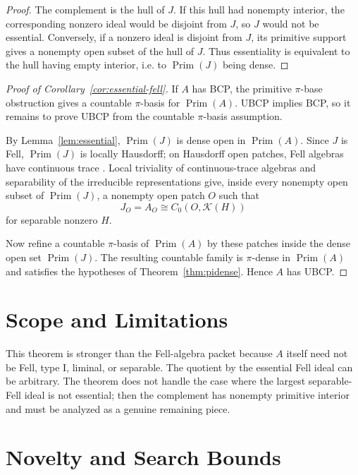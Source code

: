 \documentclass[11pt]{article}
\newcommand{\Kcal}{\mathcal K}
\newcommand{\Prim}{\operatorname{Prim}}
\begin{document}
\begin{proof}
The complement is the hull of \(J\).  If this hull had nonempty interior, the
corresponding nonzero ideal would be disjoint from \(J\), so \(J\) would not
be essential.  Conversely, if a nonzero ideal is disjoint from \(J\), its
primitive support gives a nonempty open subset of the hull of \(J\).  Thus
essentiality is equivalent to the hull having empty interior, i.e. to
\(\Prim(J)\) being dense.
\end{proof}

\begin{proof}[Proof of Corollary~\ref{cor:essential-fell}]
If \(A\) has BCP, the primitive \(\pi\)-base obstruction
\cite{lane19primitive} gives a countable \(\pi\)-basis for \(\Prim(A)\).
UBCP implies BCP, so it remains to prove UBCP from the countable
\(\pi\)-basis assumption.

By Lemma~\ref{lem:essential}, \(\Prim(J)\) is dense open in \(\Prim(A)\).
Since \(J\) is Fell, \(\Prim(J)\) is locally Hausdorff; on Hausdorff open
patches, Fell algebras have continuous trace \cite{CHR}.  Local triviality of
continuous-trace algebras and separability of the irreducible representations
give, inside every nonempty open subset of \(\Prim(J)\), a nonempty open
patch \(O\) such that
\[
        J_O=A_O\cong C_0(O,\Kcal(H))
\]
for separable nonzero \(H\).

Now refine a countable \(\pi\)-basis of \(\Prim(A)\) by these patches inside
the dense open set \(\Prim(J)\).  The resulting countable family is
\(\pi\)-dense in \(\Prim(A)\) and satisfies the hypotheses of
Theorem~\ref{thm:pidense}.  Hence \(A\) has UBCP.
\end{proof}

\section*{Scope and Limitations}

This theorem is stronger than the Fell-algebra packet because \(A\) itself
need not be Fell, type I, liminal, or separable.  The quotient by the
essential Fell ideal can be arbitrary.  The theorem does not handle the case
where the largest separable-Fell ideal is not essential; then the complement
has nonempty primitive interior and must be analyzed as a genuine remaining
piece.

\section*{Novelty and Search Bounds}
\end{document}
